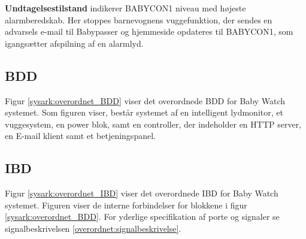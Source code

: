 \textbf{Undtagelsestilstand} indikerer BABYCON1 niveau med højeste alarmberedskab. Her stoppes barnevognens vuggefunktion, der sendes en advarsels e-mail til Babypasser og hjemmeside opdateres til BABYCON1, som igangsætter afspilning af en alarmlyd. 


\subsection{BDD}
Figur \ref{sysark:overordnet_BDD} viser det overordnede BDD for Baby Watch systemet. Som figuren viser, består systemet af en intelligent lydmonitor, et vuggesystem, en power blok, samt en controller, der indeholder en HTTP server, en E-mail klient samt et betjeningspanel.


\subsection{IBD}

Figur \ref{sysark:overordnet_IBD} viser det overordnede IBD for Baby Watch systemet.  Figuren viser de interne forbindelser for blokkene i figur \ref{sysark:overordnet_BDD}. For yderlige specifikation af porte og signaler se signalbeskrivelsen \ref{overordnet:signalbeskrivelse}.

